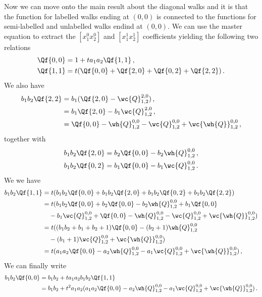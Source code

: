 Now we can move onto the main result about the diagonal walks and it is that the function for labelled walks ending at $(0,0)$ is connected to the functions for semi-labelled and unlabelled walks endind at $(0,0)$. We can use the master equation to extract the $[x_1^0x_2^0]$ and $[x_1^1x_2^1]$ coefficients yielding the following two relations
\begin{align}
	\Qf{0,0} &= 1 + ta_1a_2 \Qf{1,1}\,,\\
	\Qf{1,1} &= t(\Qf{0,0}+\Qf{2,0}+\Qf{0,2}+\Qf{2,2})\,.
\end{align}
We also have
\begin{align}
\begin{split}
	b_1b_2\Qf{2,2} &= b_1(\Qf{2,0}-\wc{Q}_{1,2}^{2,0})\,,\\
	&= b_1 \Qf{2,0} - b_1\wc{Q}_{1,2}^{2,0}\,,\\
	&= \Qf{0,0}-\wh{Q}_{1,2}^{0,0}-\wc{Q}_{1,2}^{0,0}+\wc{\wh{Q}}_{1,2}^{0,0}\,,
\end{split}
\end{align}
together with
\begin{align}
	b_1b_2\Qf{2,0} &= b_2 \Qf{0,0} - b_2 \wh{Q}_{1,2}^{0,0}\,,\\
	b_1b_2\Qf{0,2} &= b_1 \Qf{0,0} - b_1 \wc{Q}_{1,2}^{0,0}\,.
\end{align}
We we have
\begin{align}
\begin{split}
b_1b_2\Qf{1,1} &= t(b_1b_2\Qf{0,0}+b_1b_2\Qf{2,0}+b_1b_2\Qf{0,2}+b_1b_2\Qf{2,2})\\
	&= t(b_1b_2\Qf{0,0}+ b_2 \Qf{0,0} - b_2 \wh{Q}_{1,2}^{0,0}+ b_1 \Qf{0,0} \\
	&\quad- b_1 \wc{Q}_{1,2}^{0,0}+\Qf{0,0}-\wh{Q}_{1,2}^{0,0}-\wc{Q}_{1,2}^{0,0}+\wc{\wh{Q}}_{1,2}^{0,0})\\
	&= t((b_1b_2+b_1+b_2+1)\Qf{0,0}-(b_2+1)\wh{Q}_{1,2}^{0,0}\\
	&\quad-(b_1+1)\wc{Q}_{1,2}^{0,0}+\wc{\wh{Q}}_{1,2}^{0,0})\\
	&=t(a_1a_2\Qf{0,0}-a_2\wh{Q}_{1,2}^{0,0}-a_1\wc{Q}_{1,2}^{0,0}+\wc{\wh{Q}}_{1,2}^{0,0})\,,
\end{split}
\end{align}
We can finally write
\begin{align}
\begin{split}
	b_1b_2\Qf{0,0} &= b_1b_2 + ta_1a_2b_1b_2\Qf{1,1}\\
		& =  b_1b_2 + t^2a_1a_2(a_1a_2\Qf{0,0}-a_2\wh{Q}_{1,2}^{0,0}-a_1\wc{Q}_{1,2}^{0,0}+\wc{\wh{Q}}_{1,2}^{0,0})\,.
\end{split}
\end{align}
